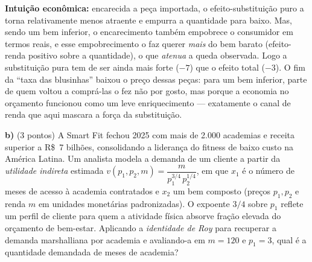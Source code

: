 \begin{solucao}
\textbf{Intuição econômica:} encarecida a peça importada, o efeito-substituição puro a torna relativamente menos atraente e empurra a quantidade para baixo. Mas, sendo um bem inferior, o encarecimento também empobrece o consumidor em termos reais, e esse empobrecimento o faz querer \emph{mais} do bem barato (efeito-renda positivo sobre a quantidade), o que \emph{atenua} a queda observada. Logo a substituição pura tem de ser ainda mais forte ($-7$) que o efeito total ($-3$). O fim da ``taxa das blusinhas'' baixou o preço dessas peças: para um bem inferior, parte de quem voltou a comprá-las o fez não por gosto, mas porque a economia no orçamento funcionou como um leve enriquecimento --- exatamente o canal de renda que aqui mascara a força da substituição.
\end{solucao}

\textbf{b)} (3 pontos) A Smart Fit fechou 2025 com mais de 2.000 academias e receita superior a R\$~7 bilhões, consolidando a liderança do fitness de baixo custo na América Latina. Um analista modela a demanda de um cliente a partir da \emph{utilidade indireta} estimada $v(p_1,p_2,m)=\dfrac{m}{p_1^{3/4}\,p_2^{1/4}}$, em que $x_1$ é o número de meses de acesso à academia contratados e $x_2$ um bem composto (preços $p_1,p_2$ e renda $m$ em unidades monetárias padronizadas). O expoente $3/4$ sobre $p_1$ reflete um perfil de cliente para quem a atividade física absorve fração elevada do orçamento de bem-estar. Aplicando a \emph{identidade de Roy} para recuperar a demanda marshalliana por academia e avaliando-a em $m=120$ e $p_1=3$, qual é a quantidade demandada de meses de academia?

